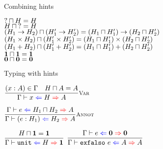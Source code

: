 \documentclass{beamer}
\newcommand{\Fun}[2]{#1 \to #2}
\newcommand{\Prod}[2]{#1 \times #2}
\newcommand{\Sum}[2]{#1 + #2}
\newcommand{\Unit}{\textbf{1}}
\newcommand{\Empty}{\textbf{0}}
\newcommand{\annot}[2]{(#1 : #2)}
\newcommand{\unit}{\texttt{unit}}
\newcommand{\elimEmpty}[1][]{\texttt{exfalso}\ #1}
\newcommand{\infrule}[3][]{\displaystyle \frac{#2}{#3} \textsc{\footnotesize{#1}}}
\newcommand{\sidecond}[1]{#1}
\begin{document}
\begin{frame}{Combining hints}

\begin{center}
  $\mathbf{?} \sqcap H = H$ \\
  $H \sqcap \mathbf{?} = H$ \\
  $\combinehints{(\Fun{H_1}{H_2})}{(\Fun{H'_1}{H'_2})} = \Fun{(\combinehints{H_1}{H'_1})}{(\combinehints{H_2}{H'_2})}$ \\
  $\combinehints{(\Prod{H_1}{H_2})}{(\Prod{H'_1}{H'_2})} = \Prod{(\combinehints{H_1}{H'_1})}{(\combinehints{H_2}{H'_2})}$ \\
  $\combinehints{(\Sum{H_1}{H_2})}{(\Sum{H'_1}{H'_2})} = \Sum{(\combinehints{H_1}{H'_1})}{(\combinehints{H_2}{H'_2})}$ \\
  $\combinehints{\Unit}{\Unit} = \Unit$ \\
  $\combinehints{\Empty}{\Empty} = \Empty$
\end{center}

\end{frame}

\begin{frame}{Typing with hints}

\begin{center}
  $\infrule[Var]{\sidecond{(x : A) \in \Gamma} \quad \sidecond{\combinehints{H}{A} = A}}{\hinting{x}{H}{A}}$

  \vspace{2em}

  $\infrule[Annot]{\hinting{e}{\combinehints{H_1}{H_2}}{A}}{\hinting{\annot{e}{H_1}}{H_2}{A}}$

  \vspace{2em}

  $\infrule{\sidecond{\combinehints{H}{\Unit} = \Unit}}{\hinting{\unit}{H}{\Unit}}$ \quad
  $\infrule{\hinting{e}{\Empty}{\Empty}}{\hinting{\elimEmpty[e]}{A}{A}}$
\end{center}

\end{frame}
\end{document}
